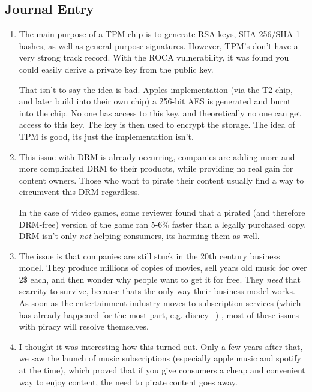 \documentclass{scrartcl}
\begin{document}
\subsection{Journal Entry}
\label{sec:orgec2241b}
\begin{enumerate}
\item The main purpose of a TPM chip is to generate RSA keys, SHA-256/SHA-1 hashes,
as well as general purpose signatures. However, TPM's don't have a very
strong track record. With the ROCA vulnerability, it was found you could
easily derive a private key from the public key.

That isn't to say the idea is bad. Apples implementation (via the T2 chip,
and later build into their own chip) a 256-bit AES is generated and burnt
into the chip. No one has access to this key, and theoretically no one can
get access to this key. The key is then used to encrypt the storage. The idea
of TPM is good, its just the implementation isn't.

\item This issue with DRM is already occurring, companies are adding more and more
complicated DRM to their products, while providing no real gain for content
owners. Those who want to pirate their content usually find a way to
circumvent this DRM regardless.

In the case of video games, some reviewer
found that a pirated (and therefore DRM-free) version of the game ran 5-6\%
faster than a legally purchased copy. DRM isn't only \emph{not} helping consumers,
its harming them as well.

\item The issue is that companies are still stuck in the 20th century business
model. They produce millions of copies of movies, sell years old music for
over 2\$ each, and then wonder why people want to get it for free. They \emph{need}
that scarcity to survive, because thats the only way their business model
works. As soon as the entertainment industry moves to subscription services
(which has already happened for the most part, e.g. disney+) , most of these
issues with piracy will resolve themselves.

\item I thought it was interesting how this turned out. Only a few years after
that, we saw the launch of music subscriptions (especially apple music and
spotify at the time), which proved that if you give consumers a cheap and
convenient way to enjoy content, the need to pirate content goes away.
\end{enumerate}
\end{document}

